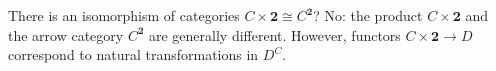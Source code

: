 There is an isomorphism of categories $C \times \mathbf{2} \cong C^{\mathbf{2}}$? No: the product $C \times \mathbf{2}$ and the arrow category $C^{\mathbf{2}}$ are generally different. However, functors $C \times \mathbf{2} \to D$ correspond to natural transformations in $D^C$.
